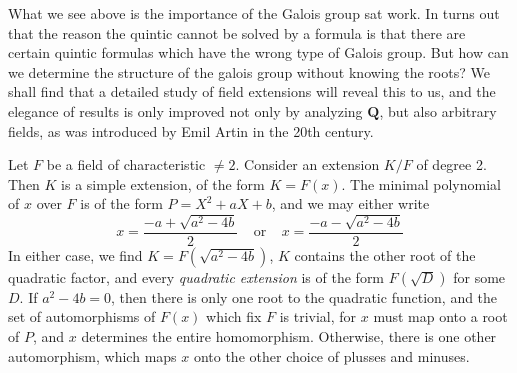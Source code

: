 














What we see above is the importance of the Galois group sat work. In turns out that the reason the quintic cannot be solved by a formula is that there are certain quintic formulas which have the wrong type of Galois group. But how can we determine the structure of the galois group without knowing the roots? We shall find that a detailed study of field extensions will reveal this to us, and the elegance of results is only improved not only by analyzing $\mathbf{Q}$, but also arbitrary fields, as was introduced by Emil Artin in the 20th century.

\begin{example}
    Let $F$ be a field of characteristic $\neq 2$. Consider an extension $K/F$ of degree 2. Then $K$ is a simple extension, of the form $K = F(x)$. The minimal polynomial of $x$ over $F$ is of the form $P = X^2 + aX + b$, and we may either write
    \[ x = \frac{-a + \sqrt{a^2 - 4b}}{2}\ \ \ \ \ \text{or}\ \ \ \ \ x = \frac{-a - \sqrt{a^2 - 4b}}{2} \]
    In either case, we find $K = F(\sqrt{a^2 - 4b})$, $K$ contains the other root of the quadratic factor, and every {\it quadratic extension} is of the form $F(\sqrt{D})$ for some $D$. If $a^2 - 4b = 0$, then there is only one root to the quadratic function, and the set of automorphisms of $F(x)$ which fix $F$ is trivial, for $x$ must map onto a root of $P$, and $x$ determines the entire homomorphism. Otherwise, there is one other automorphism, which maps $x$ onto the other choice of plusses and minuses.
\end{example}

